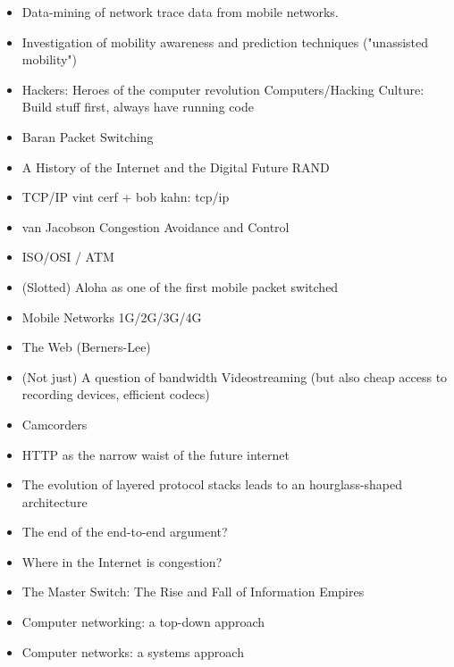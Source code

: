 \begin{itemize}
\item Data-mining of network trace data from mobile networks.
\item Investigation of mobility awareness and prediction techniques ("unassisted mobility")


\item Hackers: Heroes of the computer revolution \cite{levy2010hackers}
        Computers/Hacking Culture: Build stuff first, always have running code
\item Baran Packet Switching
\item A History of the Internet and the Digital Future \cite{ryan2010history}
        RAND
\item TCP/IP vint cerf + bob kahn: tcp/ip \cite{1092259}
\item van Jacobson Congestion Avoidance and Control \cite{jacobson1988congestion}
\item ISO/OSI / ATM
\item (Slotted) Aloha as one of the first mobile packet switched
\item Mobile Networks 1G/2G/3G/4G
\item The Web (Berners-Lee)
\item (Not just) A question of bandwidth Videostreaming (but also cheap access to recording devices, efficient codecs)
\item Camcorders

\item HTTP as the narrow waist of the future internet \cite{Popa:2010:HNW:1868447.1868453}
\item The evolution of layered protocol stacks leads to an hourglass-shaped architecture \cite{akhshabi2011evolution}
\item The end of the end-to-end argument? \cite{reed2000endofe2e}
\item Where in the Internet is congestion? \cite{genin2013internet}
\item The Master Switch: The Rise and Fall of Information Empires \cite{wu2010master}

\item Computer networking: a top-down approach \cite{kurose2008computer}
\item Computer networks: a systems approach \cite{peterson2007computer}


\end{itemize}

